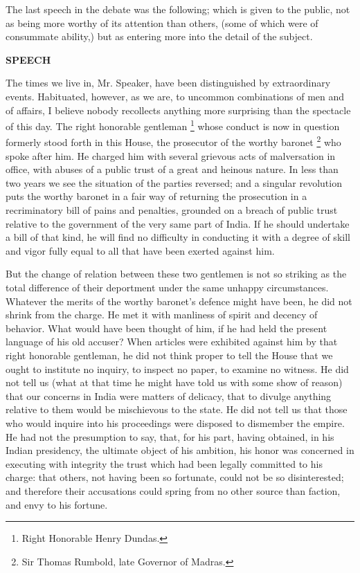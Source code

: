 The last speech in the debate was the following; which is given to the public, not as being more worthy of its attention than others, (some of which were of consummate ability,) but as entering more into the detail of the subject.

\vspace{0.3cm}
\begin{center}
  \textbf{\large SPEECH} \par 
\end{center}

The times we live in, Mr. Speaker, have been distinguished by extraordinary events. Habituated, however, as we are, to uncommon combinations of men and of affairs, I believe nobody recollects anything more surprising than the spectacle of this day. The right honorable gentleman
\footnote{ Right Honorable Henry Dundas.}
 whose conduct is now in question formerly stood forth in this House, the prosecutor of the worthy baronet
\footnote{ Sir Thomas Rumbold, late Governor of Madras.}
 who spoke after him. He charged him with several grievous acts of malversation in office, with abuses of a public trust of a great and heinous nature. In less than two years we see the situation of the parties reversed; and a singular revolution puts the worthy baronet in a fair way of returning the prosecution in a recriminatory bill of pains and penalties, grounded on a breach of public trust relative to the government of the very same part of India. If he should undertake a bill of that kind, he will find no difficulty in conducting it with a degree of skill and vigor fully equal to all that have been exerted against him.

But the change of relation between these two gentlemen is not so striking as the total difference of their deportment under the same unhappy circumstances. Whatever the merits of the worthy baronet's defence might have been, he did not shrink from the charge. He met it with manliness of spirit and decency of behavior. What would have been thought of him, if he had held the present language of his old accuser? When articles were exhibited against him by that right honorable gentleman, he did not think proper to tell the House that we ought to institute no inquiry, to inspect no paper, to examine no witness. He did not tell us (what at that time he might have told us with some show of reason) that our concerns in India were matters of delicacy, that to divulge anything relative to them would be mischievous to the state. He did not tell us that those who would inquire into his proceedings were disposed to dismember the empire. He had not the presumption to say, that, for his part, having obtained, in his Indian presidency, the ultimate object of his ambition, his honor was concerned in executing with integrity the trust which had been legally committed to his charge: that others, not having been so fortunate, could not be so disinterested; and therefore their accusations could spring from no other source than faction, and envy to his fortune.

